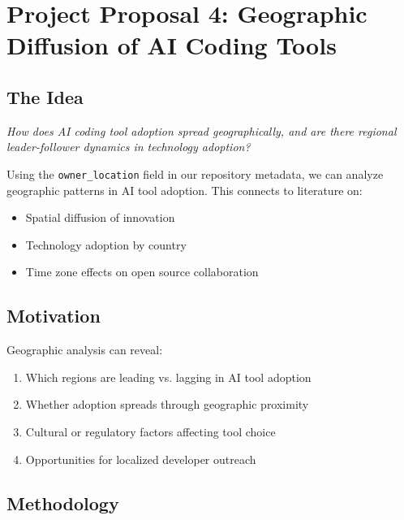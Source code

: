 \documentclass[11pt,letterpaper]{article}
\begin{document}
\section{Project Proposal 4: Geographic Diffusion of AI Coding Tools}

\subsection{The Idea}

\begin{tcolorbox}[colback=red!5,colframe=red!75!black,title=Core Question]
\textit{How does AI coding tool adoption spread geographically, and are there regional leader-follower dynamics in technology adoption?}
\end{tcolorbox}

Using the \texttt{owner\_location} field in our repository metadata, we can analyze geographic patterns in AI tool adoption. This connects to literature on:
\begin{itemize}
    \item Spatial diffusion of innovation
    \item Technology adoption by country
    \item Time zone effects on open source collaboration
\end{itemize}

\subsection{Motivation}

Geographic analysis can reveal:
\begin{enumerate}
    \item Which regions are leading vs. lagging in AI tool adoption
    \item Whether adoption spreads through geographic proximity
    \item Cultural or regulatory factors affecting tool choice
    \item Opportunities for localized developer outreach
\end{enumerate}

\subsection{Methodology}
\end{document}

